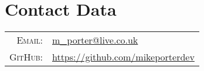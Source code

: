 \section{Contact Data}

\begin{tabular}{rl}
    \textsc{Email:}     & \href{mailto:m_porter@live.co.uk}{m\_porter@live.co.uk} \\
    \textsc{GitHub:}	& \href{https://github.com/mikeporterdev/}{https://github.com/mikeporterdev}
\end{tabular}